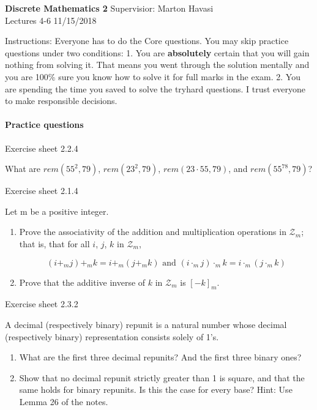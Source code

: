 \documentclass{exam}
\begin{document}
\noindent
\large\textbf{Discrete Mathematics 2} \hfill Supervisior: Marton Havasi \\
\normalsize Lectures 4-6 \hfill 11/15/2018

Instructions: Everyone has to do the Core questions. You may skip practice questions under two conditions: 1. You are \textbf{absolutely} certain that you will gain nothing from solving it. That means you went through the solution mentally and you are 100\% sure you know how to solve it for full marks in the exam. 2. You are spending the time you saved to solve the tryhard questions. I trust everyone to make responsible decisions.

\paragraph{Practice questions}
\begin{questions}
\question Exercise sheet 2.2.4

What are $rem(55^2, 79)$, $rem(23^2, 79)$, $rem(23 \cdot 55, 79)$, and $rem(55^{78}, 79)$?


\question Exercise sheet 2.1.4

 Let m be a positive integer.
 
 \begin{enumerate}
\item Prove the associativity of the addition and multiplication operations in $\mathcal{Z}_m$; that is, that for all $i$, $j$, $k$
in $\mathcal{Z}_m$,

$$(i +_m j) +_m k = i +_m (j +_m k) \text{ and } (i \cdot_m j) \cdot_m k = i \cdot_m (j \cdot_m k)$$

\item Prove that the additive inverse of $k$ in $\mathcal{Z}_m$ is $[-k]_m$.
 
 \end{enumerate}

\question Exercise sheet 2.3.2

A decimal (respectively binary) repunit is a natural number whose decimal (respectively binary) representation consists solely of 1’s.
\begin{enumerate}
 \item What are the first three decimal repunits?  And the first three binary ones?
\item  Show that no decimal repunit strictly greater than 1 is square, and that the same holds for binary
repunits.  Is this the case for every base?
Hint:  Use Lemma 26 of the notes.
\end{enumerate} 
\end{questions}
\end{document}
